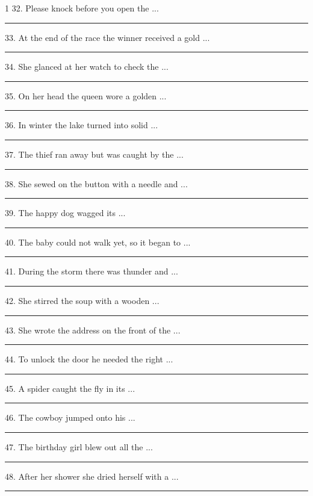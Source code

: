 \documentclass[11pt,a4paper]{article}
\newcommand{\blank}[1][1.2cm]{\rule{#1}{0.4pt}}
\begin{document}
\begin{multicols}{1}
32. Please knock before you open the ...\hfill\blank[3cm]\par\vspace{3pt}
33. At the end of the race the winner received a gold ...\hfill\blank[3cm]\par\vspace{3pt}
34. She glanced at her watch to check the ...\hfill\blank[3cm]\par\vspace{3pt}
35. On her head the queen wore a golden ...\hfill\blank[3cm]\par\vspace{3pt}
36. In winter the lake turned into solid ...\hfill\blank[3cm]\par\vspace{3pt}
37. The thief ran away but was caught by the ...\hfill\blank[3cm]\par\vspace{3pt}
38. She sewed on the button with a needle and ...\hfill\blank[3cm]\par\vspace{3pt}
39. The happy dog wagged its ...\hfill\blank[3cm]\par\vspace{3pt}
40. The baby could not walk yet, so it began to ...\hfill\blank[3cm]\par\vspace{3pt}
41. During the storm there was thunder and ...\hfill\blank[3cm]\par\vspace{3pt}
42. She stirred the soup with a wooden ...\hfill\blank[3cm]\par\vspace{3pt}
43. She wrote the address on the front of the ...\hfill\blank[3cm]\par\vspace{3pt}
44. To unlock the door he needed the right ...\hfill\blank[3cm]\par\vspace{3pt}
45. A spider caught the fly in its ...\hfill\blank[3cm]\par\vspace{3pt}
46. The cowboy jumped onto his ...\hfill\blank[3cm]\par\vspace{3pt}
47. The birthday girl blew out all the ...\hfill\blank[3cm]\par\vspace{3pt}
48. After her shower she dried herself with a ...\hfill\blank[3cm]\par\vspace{3pt}

\end{multicols}
\end{document}
